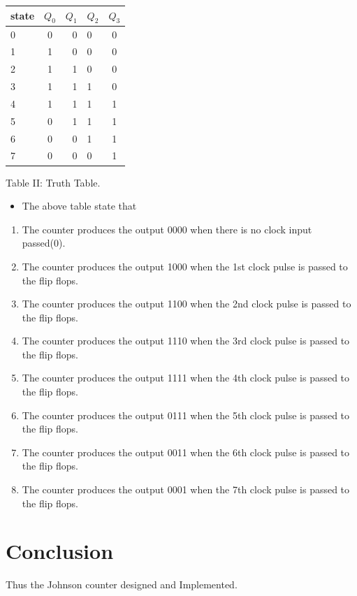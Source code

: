 \documentclass[journal,12pt,twocolumn]{IEEEtran}
\begin{document}
\begin{center}
    
    \setlength{\arrayrulewidth}{0.5mm}
\setlength{\tabcolsep}{18pt}
\renewcommand{\arraystretch}{1.5}
    \begin{tabular}{|l|c|r|l|c|}
    \hline 
      \textbf{state} & \textbf{$ Q_{0} $} & \textbf{$ Q_{1} $} & \textbf{$ Q_{2} $} & \textbf{$ Q_{3} $}
      \\
      \hline
          0&0&0&0&0
          \\ 1&1&0&0&0
          \\ 2&1&1&0&0
          \\ 3&1&1&1&0
          \\ 4&1&1&1&1
          \\ 5&0&1&1&1
          \\ 6&0&0&1&1
          \\ 7&0&0&0&1 \\
      \hline
      
   \end{tabular}
   
   \vspace{0.5cm}
   \centering Table II: Truth Table.
\label{table:2}
 \end{center}
 \begin{itemize}
 \item The above table state that
 \end{itemize}
 \begin{enumerate}
 
\item The counter produces the output 0000 when there is no clock input passed(0).
\item  The counter produces the output 1000 when the 1st clock pulse is passed to the flip flops.
 \item  The counter produces the output 1100 when the 2nd clock pulse is passed to the flip flops.  \item The counter produces the output 1110 when the 3rd clock pulse is passed to the flip flops.
\item The counter produces the output 1111 when the 4th clock pulse is  passed to the flip flops.
\item  The counter produces the output 0111 when the 5th clock pulse is passed to the flip flops.
\item The counter produces the output 0011 when the 6th clock pulse is passed to the flip flops.
\item The counter produces the output 0001 when the 7th clock pulse is passed to the flip flops.
 \end{enumerate}
 
 
 \section*{Conclusion}
 Thus the Johnson counter designed and Implemented.
\end{document}
